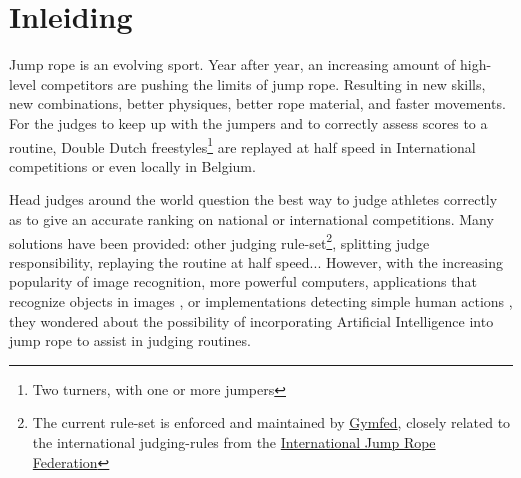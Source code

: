 
\section{Inleiding}%
\label{sec:inleiding}

    

Jump rope is an evolving sport.
Year after year, an increasing amount of high-level competitors are pushing the limits of jump rope.
Resulting in new skills, new combinations, better physiques, better rope material, and faster movements. For the judges to keep up with the jumpers and to correctly assess scores to a routine, Double Dutch freestyles\footnote{Two turners, with one or more jumpers} are replayed at half speed in International competitions or even locally in Belgium.

Head judges around the world question the best way to judge athletes correctly as to give an accurate ranking on national or international competitions.
Many solutions have been provided: other judging rule-set\footnote{The current rule-set is enforced and maintained by \href{https://www.gymfed.be/}{Gymfed}, closely related to the international judging-rules from the \href{https://ijru.sport/}{International Jump Rope Federation}}, splitting judge responsibility, replaying the routine at half speed...
However, with the increasing popularity of image recognition, more powerful computers, applications that recognize objects in images \autocite{Singh_Gill_2022}, or implementations detecting simple human actions \autocite{LUQMAN_2022}, they wondered about the possibility of incorporating Artificial Intelligence into jump rope to assist in judging routines.

